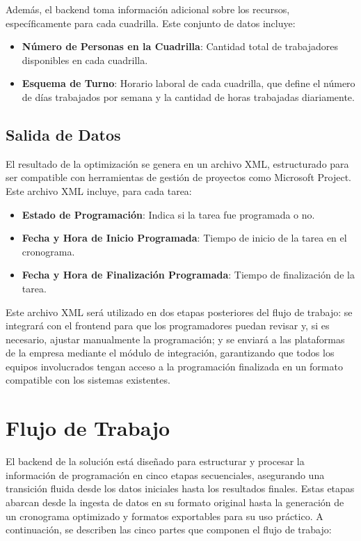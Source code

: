 \documentclass{article}
\begin{document}
Además, el backend toma información adicional sobre los recursos, específicamente para cada cuadrilla. Este conjunto de datos incluye:

\begin{itemize}
    \item \textbf{Número de Personas en la Cuadrilla}: Cantidad total de trabajadores disponibles en cada cuadrilla.
    \item \textbf{Esquema de Turno}: Horario laboral de cada cuadrilla, que define el número de días trabajados por semana y la cantidad de horas trabajadas diariamente.
\end{itemize}


\subsection{Salida de Datos}

El resultado de la optimización se genera en un archivo XML, estructurado para ser compatible con herramientas de gestión de proyectos como Microsoft Project. Este archivo XML incluye, para cada tarea:

\begin{itemize}
    \item \textbf{Estado de Programación}: Indica si la tarea fue programada o no.
    \item \textbf{Fecha y Hora de Inicio Programada}: Tiempo de inicio de la tarea en el cronograma.
    \item \textbf{Fecha y Hora de Finalización Programada}: Tiempo de finalización de la tarea.
\end{itemize}

Este archivo XML será utilizado en dos etapas posteriores del flujo de trabajo: se integrará con el frontend para que los programadores puedan revisar y, si es necesario, ajustar manualmente la programación; y se enviará a las plataformas de la empresa mediante el módulo de integración, garantizando que todos los equipos involucrados tengan acceso a la programación finalizada en un formato compatible con los sistemas existentes.


\section{Flujo de Trabajo}

El backend de la solución está diseñado para estructurar y procesar la información de programación en cinco etapas secuenciales, asegurando una transición fluida desde los datos iniciales hasta los resultados finales. Estas etapas abarcan desde la ingesta de datos en su formato original hasta la generación de un cronograma optimizado y formatos exportables para su uso práctico. A continuación, se describen las cinco partes que componen el flujo de trabajo:
\end{document}
